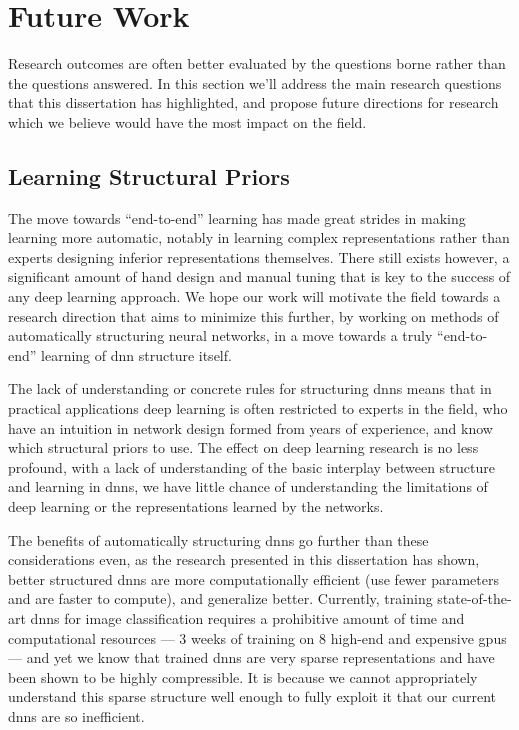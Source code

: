 \documentclass[thesis]{subfiles}
\begin{document}

\chapter{Future Work}  %
\label{futurework}


Research outcomes are often better evaluated by the questions borne rather than the questions answered. In this section we'll address the main research questions that this dissertation has highlighted, and propose future directions for research which we believe would have the most impact on the field.

\section{Learning Structural Priors}
The move towards ``end-to-end'' learning has made great strides in making learning more automatic, notably in learning complex representations rather than experts designing inferior representations themselves. There still exists however, a significant amount of hand design and manual tuning that is key to the success of any deep learning approach. We hope our work will motivate the field towards a research direction that aims to minimize this further, by working on methods of automatically structuring neural networks, in a move towards a truly ``end-to-end'' learning of \gls{dnn} structure itself.

The lack of understanding or concrete rules for structuring \glspl{dnn} means that in practical applications deep learning is often restricted to experts in the field, who have an intuition in network design formed from years of experience, and know which structural priors to use. The effect on deep learning research is no less profound, with a lack of understanding of the basic interplay between structure and learning in \glspl{dnn}, we have little chance of understanding the limitations of deep learning or the representations learned by the networks. 

The benefits of automatically structuring \glspl{dnn} go further than these considerations even, as the research presented in this dissertation has shown, better structured \glspl{dnn} are more computationally efficient (use fewer parameters and are faster to compute), and generalize better. Currently, training state-of-the-art \glspl{dnn} for image classification requires a prohibitive amount of time and computational resources --- 3 weeks of training on 8 high-end and expensive \glspl{gpu} --- and yet we know that trained \glspl{dnn} are very sparse representations and have been shown to be highly compressible. It is because we cannot appropriately understand this sparse structure well enough to fully exploit it that our current \glspl{dnn} are so inefficient.
\end{document}
